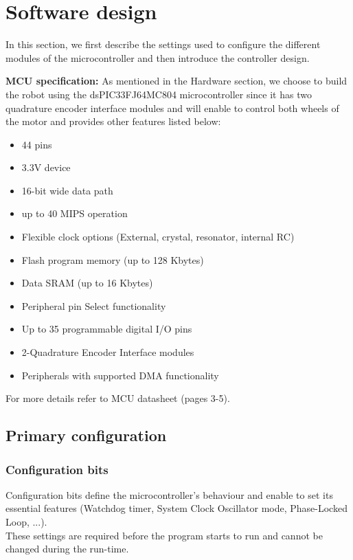\section{Software design} \label{chap:software}
In this section, we first describe the settings used to configure the different modules of the microcontroller and then introduce the controller design.

\vskip 0.2in
\noindent
\textbf{MCU specification:}
\vskip 0.1in
\noindent
As mentioned in the Hardware section, we choose to build the robot using the dsPIC33FJ64MC804 microcontroller since it has two quadrature encoder interface modules and will enable to control both wheels of the motor and provides other features listed below:
\begin{itemize}
    \item 44 pins
    \item 3.3V device
    \item 16-bit wide data path
    \item up to 40 MIPS operation
    \item Flexible clock options (External, crystal, resonator, internal RC)
    \item Flash program memory (up to 128 Kbytes)
    \item Data SRAM (up to 16 Kbytes)
    \item Peripheral pin Select functionality
    \item Up to 35 programmable digital I/O pins
    \item 2-Quadrature Encoder Interface modules
    \item Peripherals with supported DMA functionality
\end{itemize}
For more details refer to MCU datasheet \cite{mcu}(pages 3-5).

\subsection{Primary configuration}

\subsubsection*{Configuration bits}

Configuration bits define the microcontroller's behaviour and enable to set its essential features (Watchdog timer, System Clock Oscillator mode, Phase-Locked Loop, ...).\\
These settings are required before the program starts to run and cannot be changed during the run-time.\\
\vskip 0.1in
\noindent

